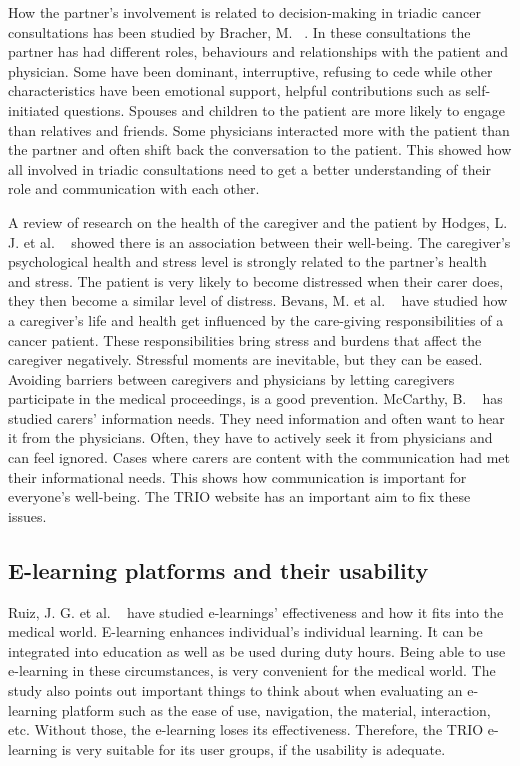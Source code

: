 \documentclass{sigchi}
\begin{document}
How the partner’s involvement is related to decision-making in triadic cancer consultations has been studied by Bracher, M. ~\cite{Bracher2019}. In these consultations the partner has had different roles, behaviours and relationships with the patient and physician. Some have been dominant, interruptive, refusing to cede while other characteristics have been emotional support, helpful contributions such as self-initiated questions. Spouses and children to the patient are more likely to engage than relatives and friends. Some physicians interacted more with the patient than the partner and often shift back the conversation to the patient. This showed how all involved in triadic consultations need to get a better understanding of their role and communication with each other.

A review of research on the health of the caregiver and the patient by Hodges, L. J. et al. ~\cite{Hodges2005} showed there is an association between their well-being. The caregiver’s psychological health and stress level is strongly related to the partner’s health and stress. The patient is very likely to become distressed when their carer does, they then become a similar level of distress. Bevans, M. et al. ~\cite{Bevans2012} have studied how a caregiver’s life and health get influenced by the care-giving responsibilities of a cancer patient. These responsibilities bring stress and burdens that affect the caregiver negatively. Stressful moments are inevitable, but they can be eased. Avoiding barriers between caregivers and physicians by letting caregivers participate in the medical proceedings, is a good prevention. McCarthy, B. ~\cite{McCarthy2011} has studied carers’ information needs. They need information and often want to hear it from the physicians. Often, they have to actively seek it from physicians and can feel ignored. Cases where carers are content with the communication had met their informational needs. This shows how communication is important for everyone’s well-being. The TRIO website has an important aim to fix these issues.  

\subsection{E-learning platforms and their usability}

Ruiz, J. G. et al. ~\cite{Ruiz2006} have studied e-learnings’ effectiveness and how it fits into the medical world. E-learning enhances individual’s individual learning. It can be integrated into education as well as be used during duty hours. Being able to use e-learning in these circumstances, is very convenient for the medical world. The study also points out important things to think about when evaluating an e-learning platform such as the ease of use, navigation, the material, interaction, etc. Without those, the e-learning loses its effectiveness. Therefore, the TRIO e-learning is very suitable for its user groups, if the usability is adequate. 
\end{document}
